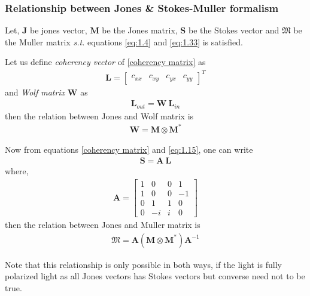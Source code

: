 \documentclass[11pt,a4paper]{article}
\numberwithin{equation}{section}
\begin{document}

\subsubsection{Relationship between Jones \& Stokes-Muller formalism}
Let, $\boldsymbol{J}$ be jones vector, $\boldsymbol{M}$ be the Jones matrix, $\boldsymbol{S}$ be the Stokes vector and $\boldsymbol{\mathfrak{M}}$ be the Muller matrix \textit{s.t.} equations \ref{eq:1.4} and \ref{eq:1.33} is satisfied.

Let us define \textit{coherency vector} of \ref{coherency matrix} as 
\begin{align}
	\boldsymbol{L}=
	\begin{bmatrix}
		c_{xx} & c_{xy} & c_{yx} & c_{yy}
	\end{bmatrix}^T
\end{align}
and \textit{Wolf matrix} $\boldsymbol{W}$ as 
\begin{align}
	\boldsymbol{L}_{out}=\boldsymbol{W}\:\boldsymbol{L}_{in}
\end{align}
then the relation between Jones and Wolf matrix is
\begin{align}
	\boldsymbol{W}=\boldsymbol{M}\otimes\boldsymbol{M}^\ast
\end{align}


Now from equations \ref{coherency matrix} and \ref{eq:1.15}, one can write
\begin{align}
	\boldsymbol{S}=\boldsymbol{A}\:\boldsymbol{L}
\end{align}
where,
\begin{align}
	\boldsymbol{A}=
	\begin{bmatrix}
		1 & 0 & 0 & 1 \\
		1 & 0 & 0 & -1 \\
		0 & 1 & 1 & 0 \\
		0 & -i & i & 0
	\end{bmatrix}
\end{align}
then the relation between Jones and Muller matrix is
\begin{align}
	\boldsymbol{\mathfrak{M}}=\boldsymbol{A} \left(\boldsymbol{M}\otimes\boldsymbol{M}^\ast\right) \boldsymbol{A}^{-1}
\end{align} 

Note that this relationship is only possible in both ways, if the light is fully polarized light as all Jones vectors has Stokes vectors but converse need not to be true.
\end{document}
